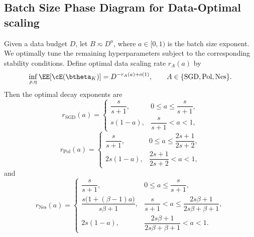 \subsection{Batch Size Phase Diagram for Data-Optimal scaling}
\label{app:fix_bsz}

\begin{theorem}
Given a data budget \(D\), let \(B\eqsim D^a\), where \(a\in[0,1)\) is the batch size exponent. We optimally tune the remaining hyperparameters subject to the corresponding stability conditions. Define optimal data scaling rate \(r_A(a)\) by
\[
\inf_{\rho,\eta}
\EE[\cE(\btheta_K)]
=
D^{-r_A(a)+o(1)},
\qquad
A\in\{\mathrm{SGD},\mathrm{Pol},\mathrm{Nes}\}.
\]
Then the optimal decay exponents are
\[
r_{\mathrm{SGD}}(a)
=
\begin{cases}
\dfrac{s}{s+1},
& 0\leq a\leq \dfrac{s}{s+1},\\[1mm]
s(1-a),
& \dfrac{s}{s+1}<a<1,
\end{cases}
\]
\[
r_{\mathrm{Pol}}(a)
=
\begin{cases}
\dfrac{s}{s+1},
& 0\leq a\leq \dfrac{2s+1}{2s+2},\\[1mm]
2s(1-a),
& \dfrac{2s+1}{2s+2}<a<1,
\end{cases}
\]
and
\[
r_{\mathrm{Nes}}(a)
=
\begin{cases}
\dfrac{s}{s+1},
& 0\leq a\leq \dfrac{s}{s+1},\\[1mm]
\dfrac{s\bigl(1+(\beta-1)a\bigr)}{s\beta+1},
& \dfrac{s}{s+1}<a\leq
\dfrac{2s\beta+1}{2s\beta+\beta+1},\\[2mm]
2s(1-a),
& \dfrac{2s\beta+1}{2s\beta+\beta+1}<a<1.
\end{cases}
\]
\end{theorem}


